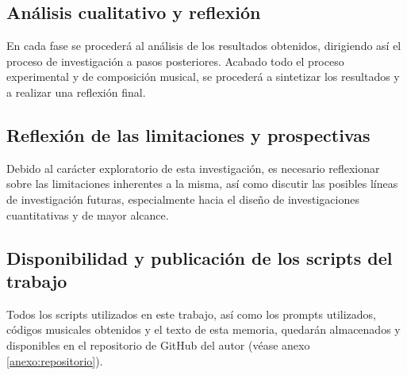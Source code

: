 \subsection{Análisis cualitativo y reflexión}
En cada fase se procederá al análisis de los resultados obtenidos, dirigiendo así el proceso de investigación a pasos posteriores. Acabado todo el proceso experimental y de composición musical, se procederá a sintetizar los resultados y a realizar una reflexión final.

\subsection{Reflexión de las limitaciones y prospectivas}
Debido al carácter exploratorio de esta investigación, es necesario reflexionar sobre las limitaciones inherentes a la misma, así como discutir las posibles líneas de investigación futuras, especialmente hacia el diseño de investigaciones cuantitativas y de mayor alcance.

\subsection{Disponibilidad y publicación de los scripts del trabajo}
Todos los scripts utilizados en este trabajo, así como los prompts utilizados, códigos musicales obtenidos y el texto de esta memoria, quedarán almacenados y disponibles en el repositorio de GitHub del autor (véase anexo \ref{anexo:repositorio}).